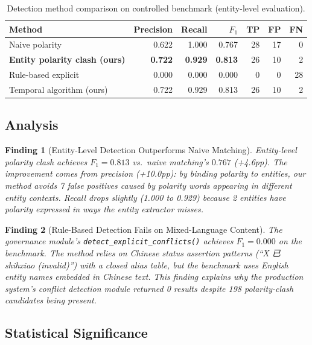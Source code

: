 \documentclass{article}
\newtheorem{finding}{Finding}
\begin{document}
\begin{table}[h]
\centering
\caption{Detection method comparison on controlled benchmark (entity-level evaluation).}
\begin{tabular}{lrrrrrr}
\toprule
Method & Precision & Recall & $F_1$ & TP & FP & FN \\
\midrule
Naive polarity & 0.622 & 1.000 & 0.767 & 28 & 17 & 0 \\
\textbf{Entity polarity clash (ours)} & \textbf{0.722} & \textbf{0.929} & \textbf{0.813} & 26 & 10 & 2 \\
Rule-based explicit & 0.000 & 0.000 & 0.000 & 0 & 0 & 28 \\
Temporal algorithm (ours) & 0.722 & 0.929 & 0.813 & 26 & 10 & 2 \\
\bottomrule
\end{tabular}
\label{tab:results}
\end{table}

\subsection{Analysis}

\begin{finding}[Entity-Level Detection Outperforms Naive Matching]
Entity-level polarity clash achieves $F_1 = 0.813$ vs.\ naive matching's $0.767$ (+4.6pp). The improvement comes from precision (+10.0pp): by binding polarity to entities, our method avoids 7 false positives caused by polarity words appearing in different entity contexts. Recall drops slightly (1.000 to 0.929) because 2 entities have polarity expressed in ways the entity extractor misses.
\end{finding}

\begin{finding}[Rule-Based Detection Fails on Mixed-Language Content]
The governance module's \texttt{detect\_explicit\_conflicts()} achieves $F_1 = 0.000$ on the benchmark. The method relies on Chinese status assertion patterns (``X 已shihxiao (invalid)'') with a closed alias table, but the benchmark uses English entity names embedded in Chinese text. This finding explains why the production system's conflict detection module returned 0 results despite 198 polarity-clash candidates being present.
\end{finding}

\subsection{Statistical Significance}
\end{document}
